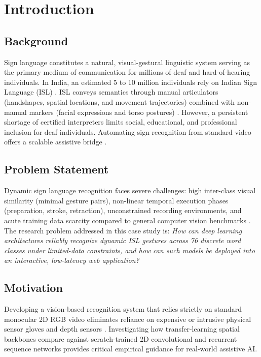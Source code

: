 \chapter{Introduction}
\label{ch:intro}

\section{Background}
\label{sec:background}
Sign language constitutes a natural, visual-gestural linguistic system serving as the primary medium of communication for millions of deaf and hard-of-hearing individuals. In India, an estimated 5 to 10 million individuals rely on Indian Sign Language (ISL) \cite{kumar2018indian}. ISL conveys semantics through manual articulators (handshapes, spatial locations, and movement trajectories) combined with non-manual markers (facial expressions and torso postures) \cite{rastgoo2021sign, adaloglou2022comprehensive}. However, a persistent shortage of certified interpreters limits social, educational, and professional inclusion for deaf individuals. Automating sign recognition from standard video offers a scalable assistive bridge \cite{starner1998real, camgoz2018neural}.

\section{Problem Statement}
\label{sec:problem_statement}
Dynamic sign language recognition faces severe challenges: high inter-class visual similarity (minimal gesture pairs), non-linear temporal execution phases (preparation, stroke, retraction), unconstrained recording environments, and acute training data scarcity compared to general computer vision benchmarks \cite{deng2009imagenet, carreira2017quo}. The research problem addressed in this case study is: \textit{How can deep learning architectures reliably recognize dynamic ISL gestures across 76 discrete word classes under limited-data constraints, and how can such models be deployed into an interactive, low-latency web application?}

\section{Motivation}
\label{sec:motivation}
Developing a vision-based recognition system that relies strictly on standard monocular 2D RGB video eliminates reliance on expensive or intrusive physical sensor gloves and depth sensors \cite{adaloglou2022comprehensive}. Investigating how transfer-learning spatial backbones compare against scratch-trained 2D convolutional and recurrent sequence networks provides critical empirical guidance for real-world assistive AI.

